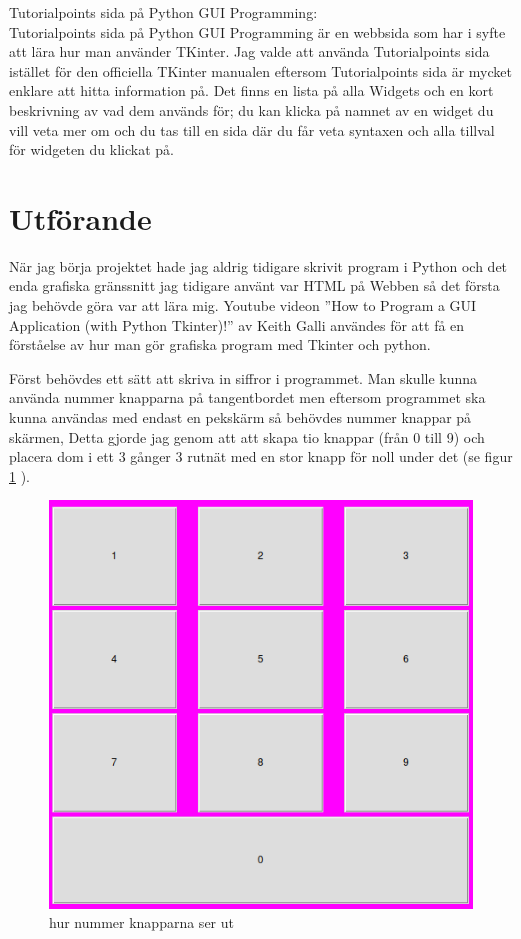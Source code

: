 \documentclass[a4paper, 12pt]{article}
\begin{document}
Tutorialpoints sida på Python GUI Programming:\\
Tutorialpoints sida på Python GUI Programming är en webbsida som har i syfte att lära hur man använder TKinter.
Jag valde att använda Tutorialpoints sida istället för den officiella TKinter manualen eftersom Tutorialpoints sida är mycket enklare att hitta information på. Det finns en lista på alla Widgets och en kort beskrivning av vad dem används för; du kan klicka på namnet av en widget du vill veta mer om och du tas till en sida där du får veta syntaxen och alla tillval för widgeten du klickat på.

\section{Utförande}

När jag börja projektet hade jag aldrig tidigare skrivit program i Python och det enda grafiska gränssnitt jag tidigare använt var HTML på Webben så det första jag behövde göra var att lära mig.
Youtube videon ''How to Program a GUI Application (with Python Tkinter)!'' av Keith Galli\cite{yt:galli} användes för att få en förståelse av hur man gör grafiska program med Tkinter och python. 


Först behövdes ett sätt att skriva in siffror i programmet.
Man skulle kunna använda nummer knapparna på tangentbordet men eftersom programmet ska kunna användas med endast en pekskärm så behövdes nummer knappar på skärmen, Detta gjorde jag genom att att skapa tio knappar (från 0 till 9)  och placera dom i ett 3 gånger 3 rutnät med en stor knapp för noll under det (se figur \ref{fig:numpad} ).


\begin{figure}[h!]
  \includegraphics[width=\linewidth]{img/numpad.png}
  \caption{hur nummer knapparna ser ut}
  \label{fig:numpad}
\end{figure}
\end{document}
